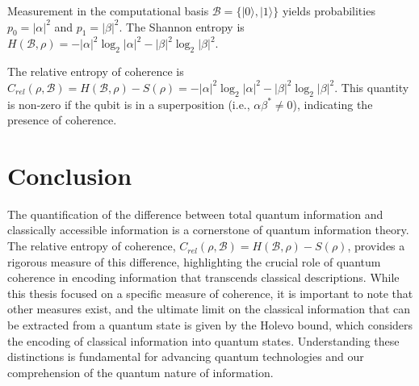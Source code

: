 	Measurement in the computational basis $\mathcal{B} = \{|0\rangle, |1\rangle\}$ yields probabilities $p_0 = |\alpha|^2$ and $p_1 = |\beta|^2$. The Shannon entropy is $H(\mathcal{B}, \rho) = -|\alpha|^2 \log_2 |\alpha|^2 - |\beta|^2 \log_2 |\beta|^2$.
	
	The relative entropy of coherence is $C_{rel}(\rho, \mathcal{B}) = H(\mathcal{B}, \rho) - S(\rho) = -|\alpha|^2 \log_2 |\alpha|^2 - |\beta|^2 \log_2 |\beta|^2$. This quantity is non-zero if the qubit is in a superposition (i.e., $\alpha \beta^* \neq 0$), indicating the presence of coherence.
	
	\section{Conclusion}
	
	The quantification of the difference between total quantum information and classically accessible information is a cornerstone of quantum information theory. The relative entropy of coherence, $C_{rel}(\rho, \mathcal{B}) = H(\mathcal{B}, \rho) - S(\rho)$, provides a rigorous measure of this difference, highlighting the crucial role of quantum coherence in encoding information that transcends classical descriptions. While this thesis focused on a specific measure of coherence, it is important to note that other measures exist, and the ultimate limit on the classical information that can be extracted from a quantum state is given by the Holevo bound, which considers the encoding of classical information into quantum states. Understanding these distinctions is fundamental for advancing quantum technologies and our comprehension of the quantum nature of information.
	
